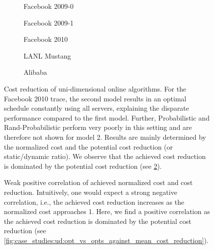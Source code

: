 \begin{figure}
    \begin{subfigure}[b]{.3425\linewidth}
    \resizebox{\textwidth}{!}{}
    \caption{Facebook 2009-0}
    \end{subfigure}
    \begin{subfigure}[b]{.32\linewidth}
    \resizebox{\textwidth}{!}{}
    \caption{Facebook 2009-1}
    \end{subfigure}
    \begin{subfigure}[b]{.32\linewidth}
    \resizebox{\textwidth}{!}{}
    \caption{Facebook 2010}
    \end{subfigure}
    \par\bigskip
    \begin{subfigure}[b]{.50\linewidth}
    \resizebox{\textwidth}{!}{}
    \caption{LANL Mustang}
    \end{subfigure}
    \begin{subfigure}[b]{.47\linewidth}
    \resizebox{\textwidth}{!}{}
    \caption{Alibaba}
    \end{subfigure}
    \caption{Cost reduction of uni-dimensional online algorithms. For the Facebook 2010 trace, the second model results in an optimal schedule constantly using all servers, explaining the disparate performance compared to the first model. Further, Probabilistic and Rand-Probabilistic perform very poorly in this setting and are therefore not shown for model 2. Results are mainly determined by the normalized cost and the potential cost reduction (or static/dynamic ratio). We observe that the achieved cost reduction is dominated by the potential cost reduction (see \cref{fig:case_studies:ud:cost_reduction_vs_normalized_cost}).}\label{fig:case_studies:ud:cost_reduction}
\end{figure}

\begin{figure}
    \centering
    
    \caption{Weak positive correlation of achieved normalized cost and cost reduction. Intuitively, one would expect a strong negative correlation, i.e., the achieved cost reduction increases as the normalized cost approaches 1. Here, we find a positive correlation as the achieved cost reduction is dominated by the potential cost reduction (see \cref{fig:case_studies:ud:opt_vs_opts_against_mean_cost_reduction}).}\label{fig:case_studies:ud:cost_reduction_vs_normalized_cost}
\end{figure}

